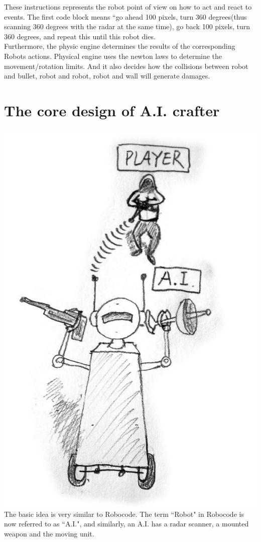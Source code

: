 \documentclass[12pt]{article}
\begin{document}
These instructions represents the robot point of view on how to act and react to events. The first code block means ``go ahead 100 pixels, turn 360 degrees(thus scanning 360 degrees with the radar at the same time), go back 100 pixels, turn 360 degrees, and repeat this until this robot dies.\\ 

Furthermore, the physic engine determines the results of the corresponding Robots actions. Physical engine uses the newton laws to determine the movement/rotation limits. And it also decides how the collisions between robot and bullet, robot and robot, robot and wall will generate damages.\\

\section{The core design of A.I. crafter}
\includegraphics[scale=0.3]{design_draft_1.jpg}\\
The basic idea is very similar to Robocode. The term ``Robot" in Robocode is now referred to as ``A.I.", and similarly, an A.I. has a radar scanner, a mounted weapon and the moving unit.\\ 
\end{document}

